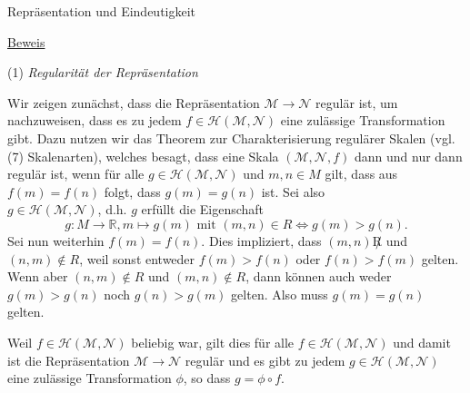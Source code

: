 \documentclass[
  8pt,
  ignorenonframetext,
]{beamer}
\begin{document}
\begin{frame}{Repräsentation und Eindeutigkeit}
\protect\hypertarget{repruxe4sentation-und-eindeutigkeit-6}{}
\footnotesize

\underline{Beweis}

\noindent (1) \emph{Regularität der Repräsentation}

Wir zeigen zunächst, dass die Repräsentation
\(\mathcal{M} \to \mathcal{N}\) regulär ist, um nachzuweisen, dass es zu
jedem \(f \in \mathcal{H}(\mathcal{M}, \mathcal{N})\) eine zulässige
Transformation gibt. Dazu nutzen wir das Theorem zur Charakterisierung
regulärer Skalen (vgl. (7) Skalenarten), welches besagt, dass eine Skala
\((\mathcal{M},\mathcal{N},f)\) dann und nur dann regulär ist, wenn für
alle \(g \in \mathcal{H}(\mathcal{M}, \mathcal{N})\) und \(m,n \in M\)
gilt, dass aus \(f(m) = f(n)\) folgt, dass \(g(m) = g(n)\) ist. Sei
also\\
\(g \in \mathcal{H}(\mathcal{M}, \mathcal{N})\), d.h. \(g\) erfüllt die
Eigenschaft \begin{equation}
g : M \to \mathbb{R}, m \mapsto g(m) \mbox{ mit } (m,n) \in R \Leftrightarrow g(m) > g(n).
\end{equation} Sei nun weiterhin \(f(m) = f(n)\). Dies impliziert, dass
\((m,n) \not R\) und \((n,m) \notin R\), weil sonst entweder
\(f(m) > f(n)\) oder \(f(n) > f(m)\) gelten. Wenn aber
\((n,m) \notin R\) und \((m,n) \notin R\), dann können auch weder
\(g(m) > g(n)\) noch \(g(n) > g(m)\) gelten. Also muss \(g(m) = g(n)\)
gelten.

Weil \(f \in \mathcal{H}(\mathcal{M}, \mathcal{N})\) beliebig war, gilt
dies für alle \(f \in \mathcal{H}(\mathcal{M}, \mathcal{N})\) und damit
ist die Repräsentation \(\mathcal{M} \to \mathcal{N}\) regulär und es
gibt zu jedem \(g \in \mathcal{H}(\mathcal{M}, \mathcal{N})\) eine
zulässige Transformation \(\phi\), so dass \(g = \phi \circ f\).
\end{frame}
\end{document}

